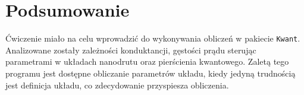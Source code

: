 \documentclass{article}
\begin{document}
\section{Podsumowanie}
Ćwiczenie miało na celu wprowadzić do wykonywania obliczeń w pakiecie \texttt{Kwant}.
Analizowane zostały zależności konduktancji, gęstości prądu sterując parametrami w układach nanodrutu oraz pierścienia kwantowego.
Zaletą tego programu jest dostępne obliczanie parametrów układu, kiedy jedyną trudnością jest definicja układu, co zdecydowanie przyspiesza obliczenia.
\end{document}
